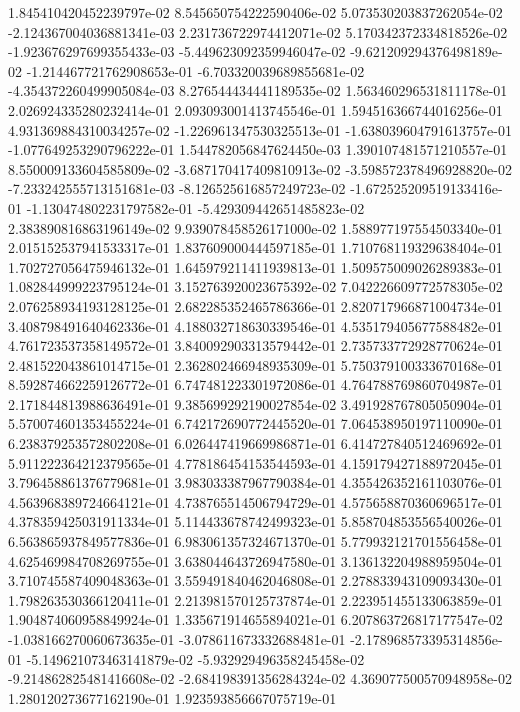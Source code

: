 1.845410420452239797e-02
8.545650754222590406e-02
5.073530203837262054e-02
-2.124367004036881341e-03
2.231736722974412071e-02
5.170342372334818526e-02
-1.923676297699355433e-03
-5.449623092359946047e-02
-9.621209294376498189e-02
-1.214467721762908653e-01
-6.703320039689855681e-02
-4.354372260499905084e-03
8.276544434441189535e-02
1.563460296531811178e-01
2.026924335280232414e-01
2.093093001413745546e-01
1.594516366744016256e-01
4.931369884310034257e-02
-1.226961347530325513e-01
-1.638039604791613757e-01
-1.077649253290796222e-01
1.544782056847624450e-03
1.390107481571210557e-01
8.550009133604585809e-02
-3.687170417409810913e-02
-3.598572378496928820e-02
-7.233242555713151681e-03
-8.126525616857249723e-02
-1.672525209519133416e-01
-1.130474802231797582e-01
-5.429309442651485823e-02
2.383890816863196149e-02
9.939078458526171000e-02
1.588977197554503340e-01
2.015152537941533317e-01
1.837609000444597185e-01
1.710768119329638404e-01
1.702727056475946132e-01
1.645979211411939813e-01
1.509575009026289383e-01
1.082844999223795124e-01
3.152763920023675392e-02
7.042226609772578305e-02
2.076258934193128125e-01
2.682285352465786366e-01
2.820717966871004734e-01
3.408798491640462336e-01
4.188032718630339546e-01
4.535179405677588482e-01
4.761723537358149572e-01
3.840092903313579442e-01
2.735733772928770624e-01
2.481522043861014715e-01
2.362802466948935309e-01
5.750379100333670168e-01
8.592874662259126772e-01
6.747481223301972086e-01
4.764788769860704987e-01
2.171844813988636491e-01
9.385699292190027854e-02
3.491928767805050904e-01
5.570074601353455224e-01
6.742172690772445520e-01
7.064538950197110090e-01
6.238379253572802208e-01
6.026447419669986871e-01
6.414727840512469692e-01
5.911222364212379565e-01
4.778186454153544593e-01
4.159179427188972045e-01
3.796458861376779681e-01
3.983033387967790384e-01
4.355426352161103076e-01
4.563968389724664121e-01
4.738765514506794729e-01
4.575658870360696517e-01
4.378359425031911334e-01
5.114433678742499323e-01
5.858704853556540026e-01
6.563865937849577836e-01
6.983061357324671370e-01
5.779932121701556458e-01
4.625469984708269755e-01
3.638044643726947580e-01
3.136132204988959504e-01
3.710745587409048363e-01
3.559491840462046808e-01
2.278833943109093430e-01
1.798263530366120411e-01
2.213981570125737874e-01
2.223951455133063859e-01
1.904874060958849924e-01
1.335671914655894021e-01
6.207863726817177547e-02
-1.038166270060673635e-01
-3.078611673332688481e-01
-2.178968573395314856e-01
-5.149621073463141879e-02
-5.932929496358245458e-02
-9.214862825481416608e-02
-2.684198391356284324e-02
4.369077500570948958e-02
1.280120273677162190e-01
1.923593856667075719e-01
